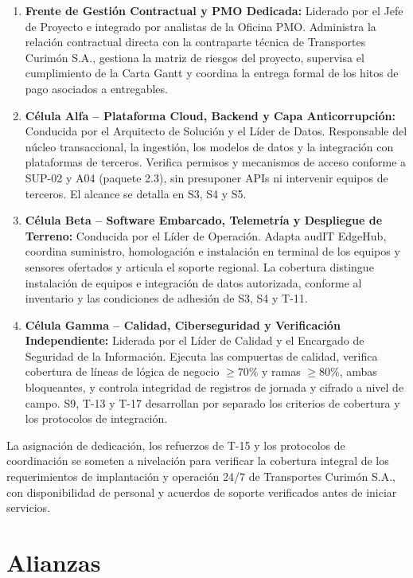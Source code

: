 \begin{enumerate}
  \item \textbf{Frente de Gestión Contractual y PMO Dedicada:} Liderado por el Jefe de Proyecto e integrado por analistas de la Oficina PMO. Administra la relación contractual directa con la contraparte técnica de Transportes Curimón S.A., gestiona la matriz de riesgos del proyecto, supervisa el cumplimiento de la Carta Gantt y coordina la entrega formal de los hitos de pago asociados a entregables.
  \item \textbf{Célula Alfa -- Plataforma Cloud, Backend y Capa Anticorrupción:} Conducida por el Arquitecto de Solución y el Líder de Datos. Responsable del núcleo transaccional, la ingestión, los modelos de datos y la integración con plataformas de terceros. Verifica permisos y mecanismos de acceso conforme a SUP-02 y A04 (paquete 2.3), sin presuponer APIs ni intervenir equipos de terceros. El alcance se detalla en S3, S4 y S5.
  \item \textbf{Célula Beta -- Software Embarcado, Telemetría y Despliegue de Terreno:} Conducida por el Líder de Operación. Adapta audIT EdgeHub, coordina suministro, homologación e instalación en terminal de los equipos y sensores ofertados y articula el soporte regional. La cobertura distingue instalación de equipos e integración de datos autorizada, conforme al inventario y las condiciones de adhesión de S3, S4 y T-11.
  \item \textbf{Célula Gamma -- Calidad, Ciberseguridad y Verificación Independiente:} Liderada por el Líder de Calidad y el Encargado de Seguridad de la Información. Ejecuta las compuertas de calidad, verifica cobertura de líneas de lógica de negocio $\ge 70\%$ y ramas $\ge 80\%$, ambas bloqueantes, y controla integridad de registros de jornada y cifrado a nivel de campo. S9, T-13 y T-17 desarrollan por separado los criterios de cobertura y los protocolos de integración.
\end{enumerate}

La asignación de dedicación, los refuerzos de T-15 y los protocolos de coordinación se someten a nivelación para verificar la cobertura integral de los requerimientos de implantación y operación 24/7 de Transportes Curimón S.A., con disponibilidad de personal y acuerdos de soporte verificados antes de iniciar servicios.

\section{Alianzas}\label{sec:1-alianzas}

